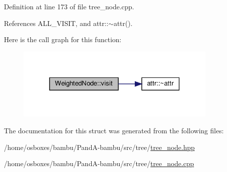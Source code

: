 Definition at line 173 of file tree\+\_\+node.\+cpp.



References A\+L\+L\+\_\+\+V\+I\+S\+IT, and attr\+::$\sim$attr().

Here is the call graph for this function\+:
\nopagebreak
\begin{figure}[H]
\begin{center}
\leavevmode
\includegraphics[width=278pt]{da/d08/structWeightedNode_a6f976feccb640a60f96475a668314fde_cgraph}
\end{center}
\end{figure}


The documentation for this struct was generated from the following files\+:\begin{DoxyCompactItemize}
\item 
/home/osboxes/bambu/\+Pand\+A-\/bambu/src/tree/\hyperlink{tree__node_8hpp}{tree\+\_\+node.\+hpp}\item 
/home/osboxes/bambu/\+Pand\+A-\/bambu/src/tree/\hyperlink{tree__node_8cpp}{tree\+\_\+node.\+cpp}\end{DoxyCompactItemize}
